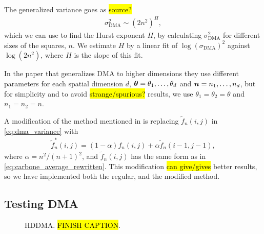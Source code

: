 The generalized variance goes as \hl{source?}
\begin{align*}
    \sigma_\text{DMA}^2 \sim \left(2n^2\right)^H,
\end{align*}
which we can use to find the Hurst exponent $H$, by calculating $\sigma_\text{DMA}^2$ for different sizes of the squares, $n$. We estimate $H$ by a linear fit of $\log \left(\sigma_\text{DMA}\right)^2$ against $\log \left(2n^2 \right)$, where $H$ is the slope of this fit.

In the paper that generalizes DMA to higher dimensions\cite{carbone2007algorithm} they use different parameters for each spatial dimension $d$, $\boldsymbol{\theta} = \theta_1, \dots, \theta_d$ and $\boldsymbol{n} = n_1, \dots, n_d$, but for simplicity and to avoid \hl{strange/spurious?} results, we use $\theta_1 = \theta_2 = \theta$ and $n_1 = n_2 = n$.

A modification of the method mentioned in \cite{carbone2007algorithm} is replacing $\tilde f_n(i,j)$ in \cref{eq:dma_variance} with
\begin{align*}
    \tilde f_n^*(i,j) = (1-\alpha) f_n(i,j) + \alpha \tilde f_n(i-1,j-1),
\end{align*}
where $\alpha = n^2/(n+1)^2$, and $\tilde f_n(i,j)$ has the same form as in \cref{eq:carbone_average_rewritten}. This modification \hl{can give/gives} better results, so we have  implemented both the regular, and the modified method.


\subsection{Testing DMA}
%
\begin{figure}[htpb]%
    \centering%
    {
        \newcommand{\f}{\footnotesize}%
        \newcommand{\x}{\text}%
        \newcommand{\thislabelaaaaaa}{{\f $H_\x{in}=H_\x{out}$}}%
    }
    \caption{%
        HDDMA. \hl{FINISH CAPTION}. %
    }%
\end{figure}%

